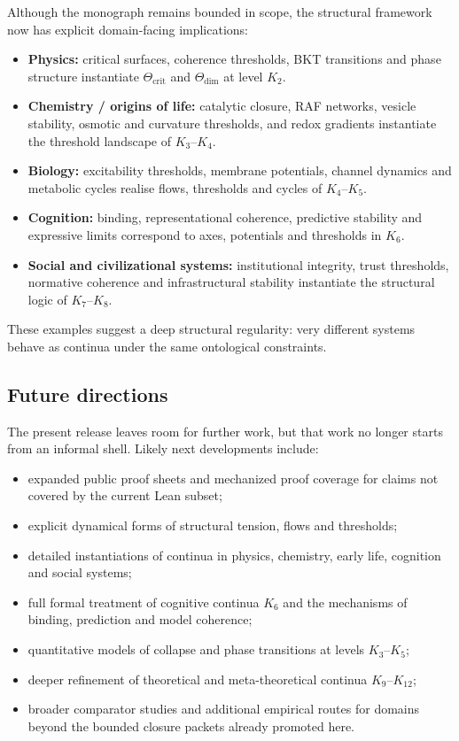 Although the monograph remains bounded in scope, the structural framework now
has explicit domain-facing implications:

\begin{itemize}
    \item \textbf{Physics:} critical surfaces, coherence thresholds, BKT transitions and phase structure instantiate
          \(\Theta_{\mathrm{crit}}\) and \(\Theta_{\mathrm{dim}}\) at level \(K_2\).
    \item \textbf{Chemistry / origins of life:} catalytic closure, RAF networks, vesicle stability,
          osmotic and curvature thresholds, and redox gradients instantiate the threshold landscape of \(K_3\)–\(K_4\).
    \item \textbf{Biology:} excitability thresholds, membrane potentials, channel dynamics and
          metabolic cycles realise flows, thresholds and cycles of \(K_4\)–\(K_5\).
    \item \textbf{Cognition:} binding, representational coherence, predictive stability and expressive limits
          correspond to axes, potentials and thresholds in \(K_6\).
    \item \textbf{Social and civilizational systems:} institutional integrity, trust thresholds,
          normative coherence and infrastructural stability instantiate the structural logic of \(K_7\)–\(K_8\).
\end{itemize}

These examples suggest a deep structural regularity:
very different systems behave as continua under the same ontological constraints.

\subsection{Future directions}

The present release leaves room for further work, but that work no longer
starts from an informal shell. Likely next developments include:

\begin{itemize}
    \item expanded public proof sheets and mechanized proof coverage for claims not covered by the current Lean subset;
    \item explicit dynamical forms of structural tension, flows and thresholds;
    \item detailed instantiations of continua in physics, chemistry, early life, cognition and social systems;
    \item full formal treatment of cognitive continua \(K_6\) and the mechanisms of binding, prediction and model coherence;
    \item quantitative models of collapse and phase transitions at levels \(K_3\)–\(K_5\);
    \item deeper refinement of theoretical and meta-theoretical continua \(K_9\)–\(K_{12}\);
    \item broader comparator studies and additional empirical routes for domains beyond the bounded closure packets already promoted here.
\end{itemize}

